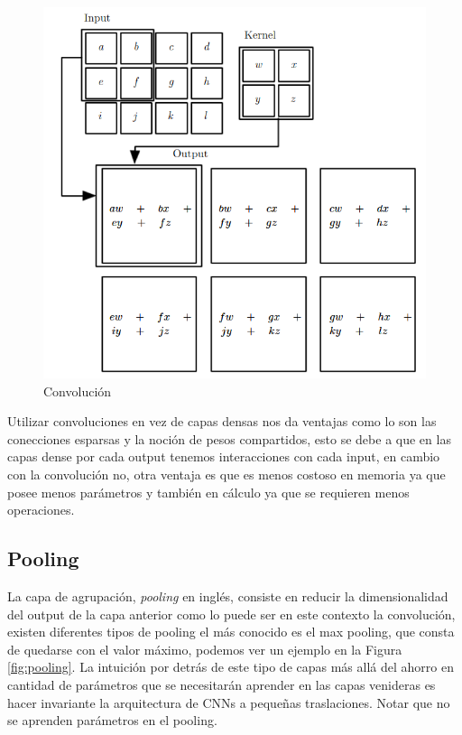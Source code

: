 \begin{figure}
\begin{center}
    \includegraphics[width=\textwidth]{images/image200.png}
    \caption{Convolución}
    \label{fig:convolution}
\end{center}
\end{figure}

Utilizar convoluciones en vez de capas densas nos da ventajas como lo son las conecciones esparsas y la noción de pesos compartidos, esto se debe a que en las capas dense por cada output tenemos interacciones con cada input, en cambio con la convolución no, otra ventaja es que es menos costoso en memoria ya que posee menos parámetros y también en cálculo ya que se requieren menos operaciones.

\subsection{Pooling}

La capa de agrupación, \textit{pooling} en inglés, consiste en reducir la dimensionalidad del output de la capa anterior como lo puede ser en este contexto la convolución, existen diferentes tipos de pooling el más conocido es el max pooling, que consta de quedarse con el valor máximo, podemos ver un ejemplo en la Figura \ref{fig:pooling}. La intuición por detrás de este tipo de capas más allá del ahorro en cantidad de parámetros que se necesitarán aprender en las capas venideras es hacer invariante la arquitectura de CNNs a pequeñas traslaciones. Notar que no se aprenden parámetros en el pooling.


